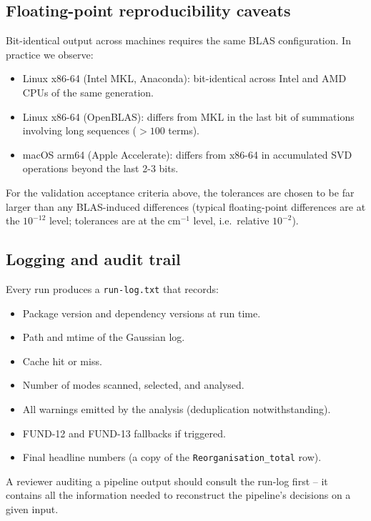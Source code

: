 \documentclass[10pt,a4paper,twoside]{article}
\newcommand{\file}[1]{\texttt{#1}}
\begin{document}
\subsection{Floating-point reproducibility caveats}

Bit-identical output across machines requires the same BLAS
configuration. In practice we observe:

\begin{itemize}
  \item Linux x86-64 (Intel MKL, Anaconda): bit-identical across
        Intel and AMD CPUs of the same generation.
  \item Linux x86-64 (OpenBLAS): differs from MKL in the last bit
        of summations involving long sequences ($> 100$ terms).
  \item macOS arm64 (Apple Accelerate): differs from x86-64 in
        accumulated SVD operations beyond the last 2-3 bits.
\end{itemize}

For the validation acceptance criteria above, the tolerances are
chosen to be far larger than any BLAS-induced differences (typical
floating-point differences are at the $10^{-12}$ level; tolerances
are at the cm$^{-1}$ level, i.e.\ relative $10^{-2}$).

\subsection{Logging and audit trail}

Every run produces a \file{run-log.txt} that records:

\begin{itemize}
  \item Package version and dependency versions at run time.
  \item Path and mtime of the Gaussian log.
  \item Cache hit or miss.
  \item Number of modes scanned, selected, and analysed.
  \item All warnings emitted by the analysis (deduplication
        notwithstanding).
  \item FUND-12 and FUND-13 fallbacks if triggered.
  \item Final headline numbers (a copy of the
        \texttt{Reorganisation\_total} row).
\end{itemize}

A reviewer auditing a pipeline output should consult the run-log
first -- it contains all the information needed to reconstruct the
pipeline's decisions on a given input.
\end{document}
